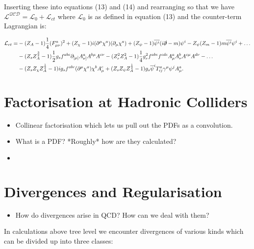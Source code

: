	Inserting these into equations (13) and (14) and rearranging so that we have
	$\mathcal{L^{QCD}} = \mathcal{L}_0 + \mathcal{L}_{ct}$ where $\mathcal{L}_0$
	is as defined in equation (13) and the counter-term Lagrangian is:

	\begin{equation}
	\begin{split}
		\mathcal{L}_{ct} = &-(Z_A - 1)\frac{1}{4}(F^a_{\mu\nu})^2 + (Z_\chi - 1)
		i(\partial^\mu\chi^a)(\partial_\mu\chi^a) + (Z_\psi - 1)\overline{\psi^i}
		(i\slashed \partial - m)\psi^i - Z_\psi(Z_m - 1)m\overline{\psi^i}\psi^i + \ldots \\
		&-(Z_sZ_A^\frac{3}{2}-1)\frac{1}{2}g_sf^{abc}\partial_{[\mu]}A^a_{\nu]}A^{b\mu}A^{c\nu} -
		(Z_s^2Z^2_A - 1)\frac{1}{4}g_s^2f^{abe}f^{cde}A^a_\mu A^b_\nu A^{c\mu}A^{d\nu} - \ldots \\
		&-(Z_sZ_\chi Z_A^\frac{1}{2} - 1)ig_sf^{abc}(\partial^\mu\chi^a)\chi^bA^c_\mu +
		(Z_sZ_\psi Z_A^\frac{1}{2} - 1)g_s\overline{\psi}^iT^a_{ij}\gamma^\mu\psi^jA^a_\mu.
	\end{split}
	\end{equation}

\section{Factorisation at Hadronic Colliders}

	\begin{itemize}
		\item Collinear factorisation which lets us pull out the PDFs as a convolution.
		\item What is a PDF? *Roughly* how are they calculated?
		\item
	\end{itemize}

\section{Divergences and Regularisation}

	\begin{itemize}
		\item How do divergences arise in QCD?  How can we deal with them?
	\end{itemize}

	In calculations above tree level we encounter divergences of various kinds which can be divided up into three classes:

